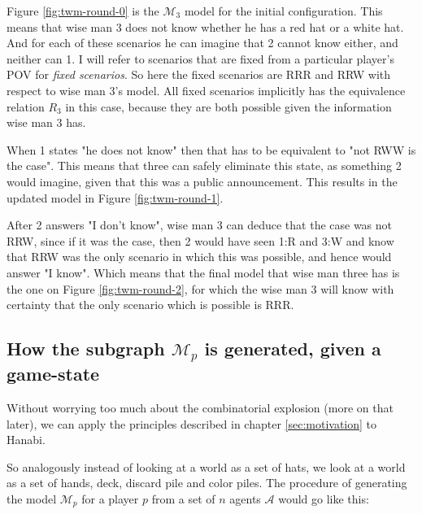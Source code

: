Figure \ref{fig:twm-round-0} is the $\mathcal{M}_{3}$ model for the initial configuration. This means that wise man 3 does not know whether he has a red hat or a white hat. And for each of these scenarios he can imagine that 2 cannot know either, and neither can 1. I will refer to scenarios that are fixed from a particular player's POV for \emph{fixed scenarios}. So here the fixed scenarios are RRR and RRW with respect to wise man 3's model. All fixed scenarios implicitly has the equivalence relation $R_3$ in this case, because they are both possible given the information wise man 3 has.

When 1 states "he does not know" then that has to be equivalent to "not RWW is the case". This means that three can safely eliminate this state, as something 2 would imagine, given that this was a public announcement. This results in the updated model in Figure \ref{fig:twm-round-1}.

After 2 answers "I don't know", wise man 3 can deduce that the case was not RRW, since if it was the case, then 2 would have seen 1:R and 3:W and know that RRW was the only scenario in which this was possible, and hence would answer "I know". Which means that the final model that wise man three has is the one on Figure \ref{fig:twm-round-2}, for which the wise man 3 will know with certainty that the only scenario which is possible is RRR.



\subsection{How the subgraph $\mathcal{M}_p$ is generated, given a game-state} \label{sec:description-of-how-modal-logic-is_applied}
Without worrying too much about the combinatorial explosion (more on that later), we can apply the principles described in chapter \ref{sec:motivation} to Hanabi. 

So analogously instead of looking at a world as a set of hats, we look at a world as a set of hands, deck, discard pile and color piles. 
The procedure of generating the model $\mathcal{M}_p$ for a player $p$ from a set of $n$ agents $\mathcal{A}$ would go like this:

